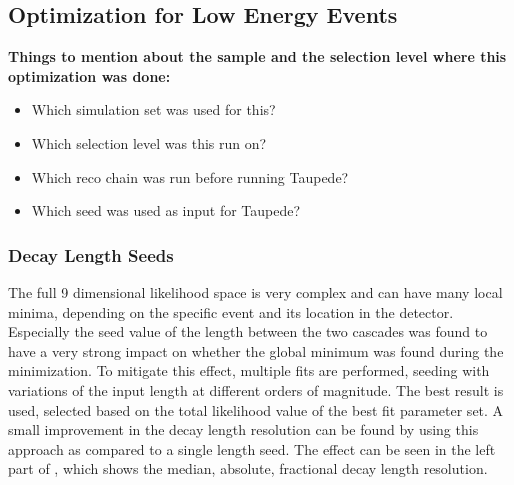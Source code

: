 \subsection{Optimization for Low Energy Events}

\textbf{Things to mention about the sample and the selection level where this optimization was done:}
\begin{itemize}
    \item Which simulation set was used for this?
    \item Which selection level was this run on?
    \item Which reco chain was run before running Taupede?
    \item Which seed was used as input for Taupede?
\end{itemize}


\subsubsection{Decay Length Seeds}

The full 9 dimensional likelihood space is very complex and can have many local minima, depending on the specific event and its location in the detector. Especially the seed value of the length between the two cascades was found to have a very strong impact on whether the global minimum was found during the minimization. To mitigate this effect, multiple fits are performed, seeding with variations of the input length at different orders of magnitude. The best result is used, selected based on the total likelihood value of the best fit parameter set. A small improvement in the decay length resolution can be found by using this approach as compared to a single length seed. The effect can be seen in the left part of , which shows the median, absolute, fractional decay length resolution.

